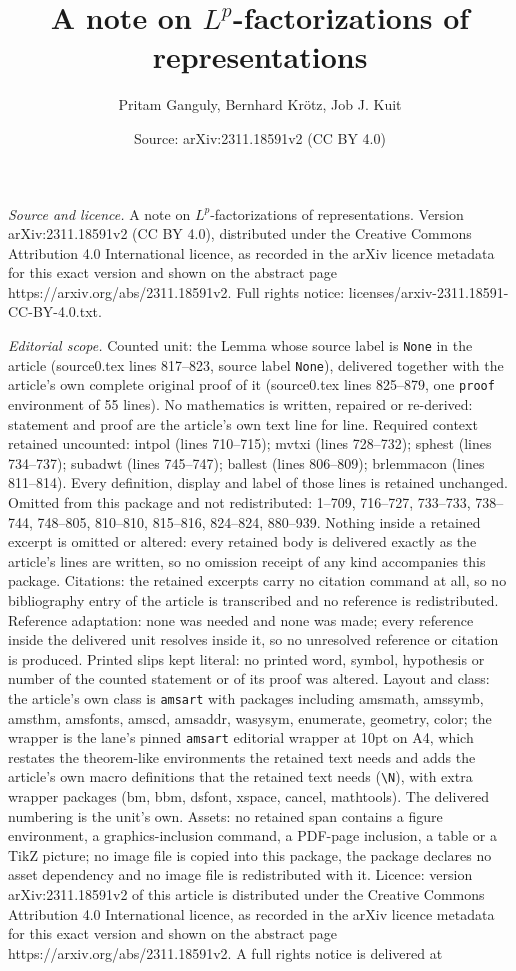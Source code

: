 \documentclass[10pt,a4paper]{amsart}
\title[A note on $L^p$-factorizations of representations]{A note on $L^p$-factorizations of representations}
\author{Pritam Ganguly, Bernhard Kr\"otz, Job J. Kuit}
\date{Source: arXiv:2311.18591v2 (CC BY 4.0)}
\begin{document}
\maketitle

\noindent\emph{Source and licence.} A note on $L^p$-factorizations of representations. Version arXiv:2311.18591v2 (CC BY 4.0), distributed under the Creative Commons Attribution 4.0 International licence, as recorded in the arXiv licence metadata for this exact version and shown on the abstract page https://arxiv.org/abs/2311.18591v2. Full rights notice: licenses/arxiv-2311.18591-CC-BY-4.0.txt.\par\smallskip

\noindent\textit{Editorial scope.} Counted unit: the Lemma whose source label is \texttt{None} in the article (source0.tex lines 817--823, source label \texttt{None}), delivered together with the article's own complete original proof of it (source0.tex lines 825--879, one \texttt{proof} environment of 55 lines). No mathematics is written, repaired or re-derived: statement and proof are the article's own text line for line. Required context retained uncounted: intpol (lines 710--715); mvtxi (lines 728--732); sphest (lines 734--737); subadwt (lines 745--747); ballest (lines 806--809); brlemmacon (lines 811--814). Every definition, display and label of those lines is retained unchanged. Omitted from this package and not redistributed: 1--709, 716--727, 733--733, 738--744, 748--805, 810--810, 815--816, 824--824, 880--939. Nothing inside a retained excerpt is omitted or altered: every retained body is delivered exactly as the article's lines are written, so no omission receipt of any kind accompanies this package. Citations: the retained excerpts carry no citation command at all, so no bibliography entry of the article is transcribed and no reference is redistributed. Reference adaptation: none was needed and none was made; every reference inside the delivered unit resolves inside it, so no unresolved reference or citation is produced. Printed slips kept literal: no printed word, symbol, hypothesis or number of the counted statement or of its proof was altered. Layout and class: the article's own class is \texttt{amsart} with packages including amsmath, amssymb, amsthm, amsfonts, amscd, amsaddr, wasysym, enumerate, geometry, color; the wrapper is the lane's pinned \texttt{amsart} editorial wrapper at 10pt on A4, which restates the theorem-like environments the retained text needs and adds the article's own macro definitions that the retained text needs (\texttt{\textbackslash N}), with extra wrapper packages (bm, bbm, dsfont, xspace, cancel, mathtools). The delivered numbering is the unit's own. Assets: no retained span contains a figure environment, a graphics-inclusion command, a PDF-page inclusion, a table or a TikZ picture; no image file is copied into this package, the package declares no asset dependency and no image file is redistributed with it. Licence: version arXiv:2311.18591v2 of this article is distributed under the Creative Commons Attribution 4.0 International licence, as recorded in the arXiv licence metadata for this exact version and shown on the abstract page https://arxiv.org/abs/2311.18591v2. A full rights notice is delivered at 
\end{document}
